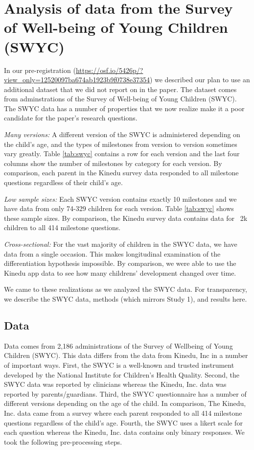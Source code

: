 \documentclass[11pt]{article}
\begin{document}
\section{Analysis of data from the Survey of Well-being of Young Children (SWYC)}

In our pre-registration (\url{https://osf.io/5426p/?view_only=12520097ba674ab1923b9f0738e37354}) we described our plan to use an additional dataset that we did not report on in the paper. The dataset comes from adminstrations of the Survey of Well-being of Young Children (SWYC). The SWYC data has a number of properties that we now realize make it a poor candidate for the paper's research questions.

\textit{Many versions:} A different version of the SWYC is administered depending on the child's age, and the types of milestones from version to version sometimes vary greatly. Table \ref{tab:swyc} contains a row for each version and the last four columns show the number of milestones by category for each version. By comparison, each parent in the Kinedu survey data responded to all milestone questions regardless of their child's age.

\textit{Low sample sizes:} Each SWYC version contains exactly 10 milestones and we have data from only 74-329 children for each version. Table \ref{tab:swyc} shows these sample sizes. By comparison, the Kinedu survey data contains data for ~2k children to all 414 milestone questions.

\textit{Cross-sectional:} For the vast majority of children in the SWYC data, we have data from a single occasion. This makes longitudinal examination of the differentiation hypothesis impossible. By comparison, we were able to use the Kinedu app data to see how many childrens' development changed over time.


We came to these realizations as we analyzed the SWYC data. For transparency, we describe the SWYC data, methods (which mirrors Study 1), and results here.

\subsection*{Data}
Data comes from 2,186 administrations of the Survey of Wellbeing of Young Children (SWYC). This data differs from the data from Kinedu, Inc in a number of important ways. First, the SWYC is a well-known and trusted instrument developed by the National Institute for Children’s Health Quality. Second, the SWYC data was reported by clinicians whereas the Kinedu, Inc. data was reported by parents/guardians. Third, the SWYC questionnaire has a number of different versions depending on the age of the child. In comparison, The Kinedu, Inc. data came from a survey where each parent responded to all 414 milestone questions regardless of the child’s age. Fourth, the SWYC uses a likert scale for each question whereas the Kinedu, Inc. data contains only binary responses. We took the following pre-processing steps.
\end{document}
